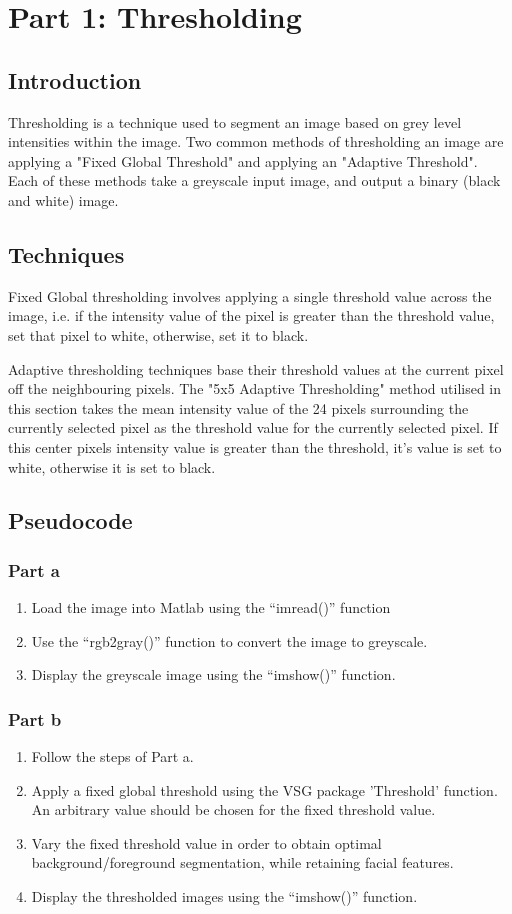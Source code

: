 \documentclass[a4paper]{article}
\begin{document}
	\section{Part 1: Thresholding}
	\subsection{Introduction}
	Thresholding is a technique used to segment an image based on grey level
	intensities within the image. Two common methods of thresholding an
	image are applying a "Fixed Global Threshold" and applying an "Adaptive
	Threshold". Each of these methods take a greyscale input image, and
	output a binary (black and white) image.
	\subsection{Techniques}
	\par Fixed Global thresholding involves applying a single threshold value
	across the image, i.e. if the intensity value of the pixel is greater
	than the threshold value, set that pixel to white, otherwise, set it to
	black.
	\par Adaptive thresholding techniques base their threshold values at the
	current pixel off the neighbouring pixels. The "5x5 Adaptive
	Thresholding" method utilised in this section takes the mean intensity
	value of the 24 pixels surrounding the currently selected pixel as the
	threshold value for the currently selected pixel. If this center pixels
	intensity value is greater than the threshold, it's value is set to
	white, otherwise it is set to black.
	\subsection{Pseudocode}
	\subsubsection{Part a}
	\begin{enumerate}
		\item Load the image into Matlab using the ``imread()''
			function
		\item Use the ``rgb2gray()'' function to convert the image to
			greyscale.
		\item Display the greyscale image using the ``imshow()''
			function.
	\end{enumerate}
	\subsubsection{Part b}
	\begin{enumerate}
		\item Follow the steps of Part a.
		\item Apply a fixed global threshold using the VSG package
			'Threshold' function. An arbitrary value should be
			chosen for the fixed threshold value.
		\item Vary the fixed threshold value in order to obtain optimal
			background/foreground segmentation, while retaining
			facial features.
		\item Display the thresholded images using the ``imshow()''
			function.
	\end{enumerate}
\end{document}
